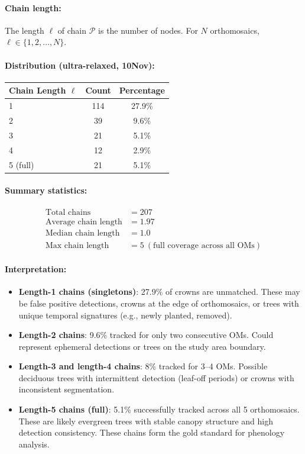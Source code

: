\paragraph{Chain length:} The length $\ell$ of chain $\mathcal{P}$ is the number of nodes. For $N$ orthomosaics, $\ell \in \{1, 2, \ldots, N\}$.

\paragraph{Distribution (ultra-relaxed, 10Nov):}
\begin{center}
\begin{tabular}{lcc}
\toprule
Chain Length $\ell$ & Count & Percentage \\
\midrule
1 & 114 & 27.9\% \\
2 & 39 & 9.6\% \\
3 & 21 & 5.1\% \\
4 & 12 & 2.9\% \\
5 (full) & 21 & 5.1\% \\
\bottomrule
\end{tabular}
\end{center}

\paragraph{Summary statistics:}
\begin{align*}
\text{Total chains} &= 207 \\
\text{Average chain length} &= 1.97 \\
\text{Median chain length} &= 1.0 \\
\text{Max chain length} &= 5 \ (\text{full coverage across all OMs})
\end{align*}

\paragraph{Interpretation:}
\begin{itemize}
    \item \textbf{Length-1 chains (singletons)}: 27.9\% of crowns are unmatched. These may be false positive detections, crowns at the edge of orthomosaics, or trees with unique temporal signatures (e.g., newly planted, removed).
    
    \item \textbf{Length-2 chains}: 9.6\% tracked for only two consecutive OMs. Could represent ephemeral detections or trees on the study area boundary.
    
    \item \textbf{Length-3 and length-4 chains}: 8\% tracked for 3--4 OMs. Possible deciduous trees with intermittent detection (leaf-off periods) or crowns with inconsistent segmentation.
    
    \item \textbf{Length-5 chains (full)}: 5.1\% successfully tracked across all 5 orthomosaics. These are likely evergreen trees with stable canopy structure and high detection consistency. These chains form the gold standard for phenology analysis.
\end{itemize}

